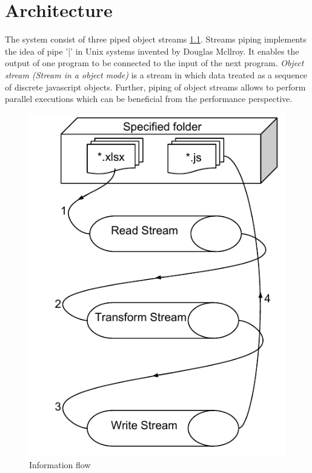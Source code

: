 \chapter{Architecture} 
\label{sec:architectureDesign}
The system consist of three piped object streams \ref{fig:tsGenArch}. Streams piping implements the idea of pipe '|' in Unix systems invented by Douglas Mcllroy. It enables the output of one program to be connected to the input of the next program. \textit{Object stream (Stream in a object mode)} is a stream in which data treated as a sequence of discrete javascript objects. Further, piping of object streams allows to perform parallel executions which can be beneficial from the performance perspective. 

\begin{figure}[ht]
	\label{fig:tsGenArch}
	\centering
	\includegraphics[scale=0.75]{grafiken/TSGeneratorArchitecture}
	\caption{Information flow}
\end{figure}

